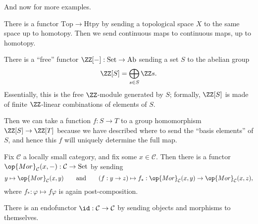 And now for more examples.
\begin{example}
	There is a functor $\mathrm{Top}\to\mathrm{Htpy}$ by sending a topological space $X$ to the same space up to homotopy. Then we send continuous maps to continuous maps, up to homotopy.
\end{example}
\begin{example}
	There is a ``free'' functor $\ZZ[-]:\mathrm{Set}\to\mathrm{Ab}$ sending a set $S$ to the abelian group
	\[\ZZ[S]=\bigoplus_{s\in S}\ZZ s.\]
	Essentially, this is the free $\ZZ$-module generated by $S$; formally, $\ZZ[S]$ is made of finite $\ZZ$-linear combinations of elements of $S$.

	Then we can take a function $f:S\to T$ to a group homomorphism $\ZZ[S]\to\ZZ[T]$ because we have described where to send the ``basis elements'' of $S$, and hence this $f$ will uniquely determine the full map.
\end{example}
\begin{example}
	Fix $\mathcal C$ a locally small category, and fix some $x\in\mathcal C$. Then there is a functor $\op{Mor}_\mathcal C(x,-):\mathcal C\to\mathrm{Set}$ by sending
	\[y\mapsto\op{Mor}_\mathcal C(x,y)\qquad\text{and}\qquad(f:y\to z)\mapsto f_*:\op{Mor}_\mathcal C(x,y)\to\op{Mor}_\mathcal C(x,z),\]
	where $f_*:\varphi\mapsto f\varphi$ is again post-composition.
\end{example}
\begin{example}
	There is an endofunctor $\id:\mathcal C\to\mathcal C$ by sending objects and morphisms to themselves.
\end{example}

